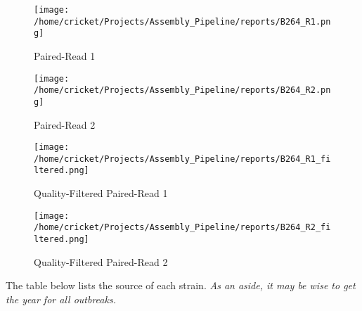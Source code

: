 \documentclass[11pt]{article}
\begin{document}
\begin{center}
\begin{figure}[ht] 
  \label{ fig7} 
  \begin{minipage}[b]{0.5\linewidth}
    \centering
    \texttt{[image: /home/cricket/Projects/Assembly\_Pipeline/reports/B264\_R1.png]}
	\caption{Paired-Read 1}
    \vspace{4ex}
  \end{minipage}%
  \begin{minipage}[b]{0.5\linewidth}
    \centering
    \texttt{[image: /home/cricket/Projects/Assembly\_Pipeline/reports/B264\_R2.png]}
	\caption{Paired-Read 2}
    \vspace{4ex}
  \end{minipage} 
\end{figure}

\vspace{-1em}

\begin{figure}[ht] 
  \label{fig8} 
  \begin{minipage}[b]{0.5\linewidth}
    \centering
    \texttt{[image: /home/cricket/Projects/Assembly\_Pipeline/reports/B264\_R1\_filtered.png]}
	\caption{Quality-Filtered Paired-Read 1}
    \vspace{4ex}
  \end{minipage}%
  \begin{minipage}[b]{0.5\linewidth}
    \centering
    \texttt{[image: /home/cricket/Projects/Assembly\_Pipeline/reports/B264\_R2\_filtered.png]}
	\caption{Quality-Filtered Paired-Read 2}
    \vspace{4ex}
  \end{minipage} 
\end{figure}
\end{center}
\clearpage

The table below lists the source of each strain. \textit{As an aside, it may be wise to get the year for all outbreaks.}\\
\end{document}
